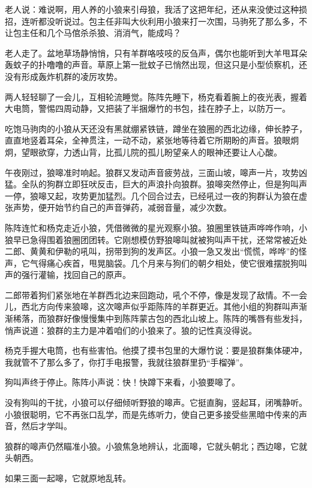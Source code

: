 \par 老人说：难说啊，用人养的小狼来引母狼，我活了这把年纪，还从来没使过这种损招，连听都没听说过。包主任非叫大伙利用小狼来打一次围，马驹死了那么多，不让包主任和几个马倌杀杀狼、消消气，能成吗？
\par 老人走了。盆地草场静悄悄，只有羊群咯吱吱的反刍声，偶尔也能听到大羊甩耳朵轰蚊子的扑噜噜的声音。草原上第一批蚊子已悄然出现，但这只是小型侦察机，还没有形成轰炸机群的凌厉攻势。
\par 两人轻轻聊了一会儿，互相轮流睡觉。陈阵先睡下，杨克看着腕上的夜光表，握着大电筒，警惕四周动静，又把装了半捆爆竹的书包，挂在脖子上，以防万一。
\par 
\par 吃饱马驹肉的小狼从天还没有黑就绷紧铁链，蹲坐在狼圈的西北边缘，伸长脖子，直直地竖着耳朵，全神贯注，一动不动，紧张地等待着它所期盼的声音。狼眼炯炯，望眼欲穿，力透山背，比孤儿院的孤儿盼望亲人的眼神还要让人心酸。
\par 午夜刚过，狼嗥准时响起。狼群又发动声音疲劳战，三面山坡，嗥声一片，攻势凶猛。全队的狗群立即狂吠反击，巨大的声浪扑向狼群。狼嗥突然停止，但是狗叫声一停，狼嗥又起，攻势更加猛烈。几个回合过去，已经吼过一夜的狗群认为狼在虚张声势，便开始节约自己的声音弹药，减弱音量，减少次数。
\par 陈阵连忙和杨克走近小狼，凭借微微的星光观察小狼。狼圈里铁链声哗哗作响，小狼早已急得围着狼圈团团转。它刚想模仿野狼嗥叫就被狗叫声干扰，还常常被近处二郎、黄黄和伊勒的吼叫，拐带到狗的发声区。小狼一急又发出“慌慌，哗哗”的怪声，它气得痛心疾首，甩晃脑袋。几个月来与狗们的朝夕相处，使它很难摆脱狗叫声的强行灌输，找回自己的原声。
\par 二郎带着狗们紧张地在羊群西北边来回跑动，吼个不停，像是发现了敌情。不一会儿，西北方向传来狼嗥，这次嗥声似乎距陈阵的羊群更近。其他小组的狗群叫声渐渐稀落，而狼群好像慢慢集中到陈阵蒙古包的西北山坡上。陈阵的嘴唇有些发抖，悄声说道：狼群的主力是冲着咱们的小狼来了。狼的记性真没得说。
\par 杨克手握大电筒，也有些害怕。他摸了摸书包里的大爆竹说：要是狼群集体硬冲，我就管不了那么多了，你打手电报警，我就往狼群里扔“手榴弹”。
\par 狗叫声终于停止。陈阵小声说：快！快蹲下来看，小狼要嗥了。
\par 没有狗叫的干扰，小狼可以仔细倾听野狼的嗥声。它挺直胸，竖起耳，闭嘴静听。小狼很聪明，它不再张口乱学，而是先练听力，使自己更多接受些黑暗中传来的声音，然后才学叫。
\par 狼群的嗥声仍然瞄准小狼。小狼焦急地辨认，北面嗥，它就头朝北；西边嗥，它就头朝西。
\par 如果三面一起嗥，它就原地乱转。
